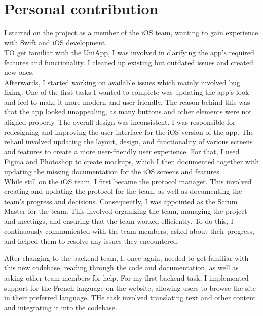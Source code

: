 \documentclass[sf-font,usefira,english]{uulm/sp/article}
\begin{document}
\\

\section{Personal contribution}

I started on the project as a member of the iOS team, wanting to gain experience with Swift and iOS development.\\
TO get familiar with the UniApp, I was involved in clarifying the app's required features and functionality. 
I cleaned up existing but outdated issues and created new ones.\\

Afterwards, I started working on available issues which mainly involved bug fixing.
One of the first tasks I wanted to complete was updating the app's look and feel to make it more modern and user-friendly. 
The reason behind this was that the app looked unappealing, as many buttons and other elements were not aligned properly.
The overall design was inconsistent. 
I was responsible for redesigning and improving the user interface for the iOS version of the app. 
The rehaul involved updating the layout, design, and functionality of various screens and features to create a more user-friendly user experience. 
For that, I used Figma and Photoshop to create mockups, which I then documented together with updating the missing documentation for the iOS screens and features.\\

While still on the iOS team, I first became the protocol manager. 
This involved creating and updating the protocol for the team, as well as documenting the team’s progress and decisions. 
Consequently, I was appointed as the Scrum Master for the team. 
This involved organizing the team, managing the project and meetings, and ensuring that the team worked efficiently. 
To do this, I continuously communicated with the team members, asked about their progress, and helped them to resolve any issues they encountered. 

After changing to the backend team, I, once again, needed to get familiar with this new codebase, reading through the code and documentation, as well as asking other team members for help.
For my first backend task, I implemented support for the French language on the website, allowing users to browse the site in their preferred language. 
THe task involved translating text and other content and integrating it into the codebase.\\
\end{document}
